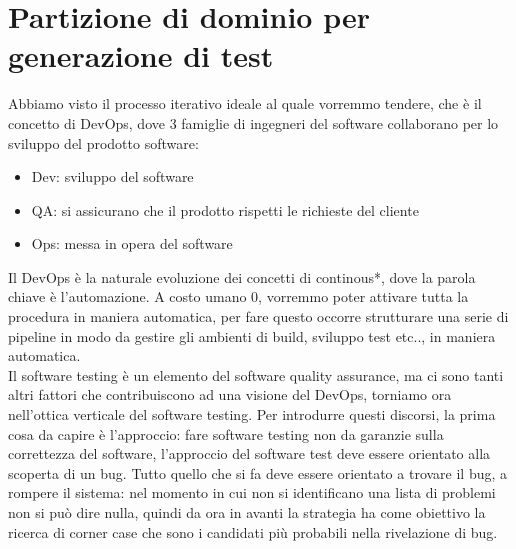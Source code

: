\documentclass{article}
\begin{document}
\section{Partizione di dominio per generazione di test}
Abbiamo visto il processo iterativo ideale al quale vorremmo tendere, che è il concetto di DevOps, dove 3 famiglie di ingegneri del software collaborano per lo sviluppo del prodotto software:
\begin{itemize}
\item Dev: sviluppo del software
\item QA: si assicurano che il prodotto rispetti le richieste del cliente
\item Ops: messa in opera del software
\end{itemize}
Il DevOps è la naturale evoluzione dei concetti di continous*, dove la parola chiave è l'automazione. A costo umano 0, vorremmo poter attivare tutta la procedura in maniera automatica, per fare questo occorre strutturare una serie di pipeline in modo da gestire gli ambienti di build, sviluppo test etc.., in maniera automatica.\\ Il software testing è un elemento del software quality assurance, ma ci sono tanti altri fattori che contribuiscono ad una visione del DevOps, torniamo ora nell'ottica verticale del software testing. Per introdurre questi discorsi, la prima cosa da capire è l'approccio: fare software testing non da garanzie sulla correttezza del software, l'approccio del software test deve essere orientato alla scoperta di un bug. Tutto quello che si fa deve essere orientato a trovare il bug, a rompere il sistema: nel momento in cui non si identificano una lista di problemi non si può dire nulla, quindi da ora in avanti la strategia ha come obiettivo la ricerca di corner case che sono i candidati più probabili nella rivelazione di bug.
\end{document}
